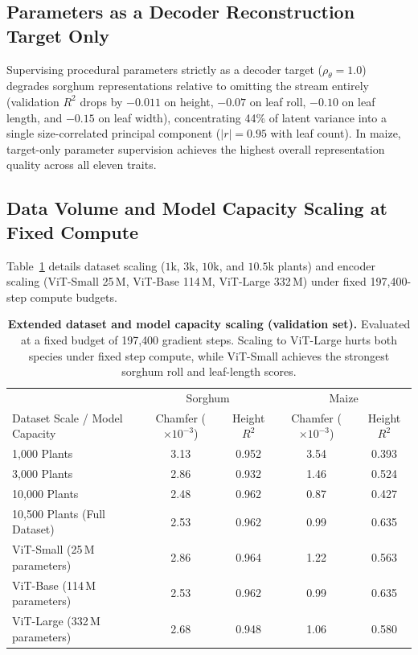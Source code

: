 \documentclass[10pt,twocolumn,letterpaper]{article}
\begin{document}
\subsection{Parameters as a Decoder Reconstruction Target Only}
Supervising procedural parameters strictly as a decoder target ($\rho_\theta = 1.0$) degrades sorghum representations relative to omitting the stream entirely (validation $R^2$ drops by $-0.011$ on height, $-0.07$ on leaf roll, $-0.10$ on leaf length, and $-0.15$ on leaf width), concentrating 44\% of latent variance into a single size-correlated principal component ($|r| = 0.95$ with leaf count). In maize, target-only parameter supervision achieves the highest overall representation quality across all eleven traits.

\subsection{Data Volume and Model Capacity Scaling at Fixed Compute}
Table~\ref{tab:supp-scaling} details dataset scaling ($1$k, $3$k, $10$k, and $10.5$k plants) and encoder scaling (ViT-Small 25\,M, ViT-Base 114\,M, ViT-Large 332\,M) under fixed 197{,}400-step compute budgets.

\begin{table}[t]
  \caption{\textbf{Extended dataset and model capacity scaling (validation set).} Evaluated at a fixed budget of 197{,}400 gradient steps. Scaling to ViT-Large hurts both species under fixed step compute, while ViT-Small achieves the strongest sorghum roll and leaf-length scores.}
  \label{tab:supp-scaling}
  \centering\small
  \begin{tabular}{lcccc}
  \toprule
   & \multicolumn{2}{c}{Sorghum} & \multicolumn{2}{c}{Maize} \\
  Dataset Scale / Model Capacity & Chamfer ($\times10^{-3}$) & Height $R^2$ & Chamfer ($\times10^{-3}$) & Height $R^2$ \\
  \midrule
  1{,}000 Plants & 3.13 & 0.952 & 3.54 & 0.393 \\
  3{,}000 Plants & 2.86 & 0.932 & 1.46 & 0.524 \\
  10{,}000 Plants & 2.48 & 0.962 & 0.87 & 0.427 \\
  10{,}500 Plants (Full Dataset) & 2.53 & 0.962 & 0.99 & 0.635 \\
  \midrule
  ViT-Small (25\,M parameters) & 2.86 & 0.964 & 1.22 & 0.563 \\
  ViT-Base (114\,M parameters) & 2.53 & 0.962 & 0.99 & 0.635 \\
  ViT-Large (332\,M parameters) & 2.68 & 0.948 & 1.06 & 0.580 \\
  \bottomrule
  \end{tabular}
\end{table}
\end{document}
